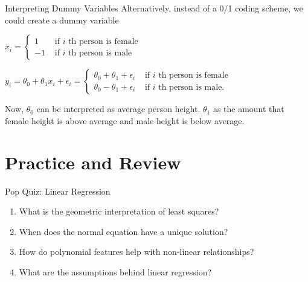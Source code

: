 \documentclass{beamer}
\begin{document}
    \begin{frame}{Interpreting Dummy Variables}
    Alternatively, instead of a 0/1 coding scheme, we could create a dummy variable
    
    \pause \(x_{i}=\left\{\begin{array}{ll}{1} & {\text { if } i \text { th person is female }} \\ {-1} & {\text { if } i \text { th person is male }}\end{array}\right.\)
    
    \pause \(y_{i}=\theta_{0}+\theta_{1} x_{i}+\epsilon_{i}=\left\{\begin{array}{ll}{\theta_{0}+\theta_{1}+\epsilon_{i}} & {\text { if } i \text { th person is female }} \\ {\theta_{0}-\theta_{1}+\epsilon_{i}} & {\text { if } i \text { th person is male. }}\end{array}\right.\)
    
    
    \pause Now, $\theta_{0}$ can be interpreted as average person height. $\theta_{1}$ as the amount that female height is above average and male height is below average.
\end{frame}

\section{Practice and Review}

\begin{frame}{Pop Quiz: Linear Regression}
\begin{enumerate}
\item What is the geometric interpretation of least squares?
\pause
\item When does the normal equation have a unique solution?
\pause
\item How do polynomial features help with non-linear relationships?
\pause
\item What are the assumptions behind linear regression?
\end{enumerate}
\end{frame}
\end{document}

